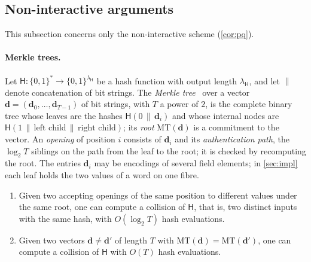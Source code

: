 \subsection{Non-interactive arguments}\label{sec:proofs:bcs}

This subsection concerns only the non-interactive scheme (\cref{cor:pq}).

\paragraph{Merkle trees.}
Let $\mathsf{H} : \{0,1\}^* \to \{0,1\}^{\lambda_{\mathsf{H}}}$ be a hash function with output length $\lambda_{\mathsf{H}}$, and let $\|$ denote concatenation of bit strings.
The \emph{Merkle tree}~\cite{Mer89} over a vector $\mathbf{d} = (\mathbf{d}_0,\dots,\mathbf{d}_{T-1})$ of bit strings, with $T$ a power of $2$, is the complete binary tree whose leaves are the hashes $\mathsf{H}(0 \,\|\, \mathbf{d}_i)$ and whose internal nodes are $\mathsf{H}(1 \,\|\, \text{left child} \,\|\, \text{right child})$; its \emph{root} $\mathrm{MT}(\mathbf{d})$ is a commitment to the vector.
An \emph{opening} of position $i$ consists of $\mathbf{d}_i$ and its \emph{authentication path}, the $\log_2 T$ siblings on the path from the leaf to the root; it is checked by recomputing the root.
The entries $\mathbf{d}_i$ may be encodings of several field elements; in \cref{sec:impl} each leaf holds the two values of a word on one fibre.

\begin{lemma}\label{lem:merkle}
\begin{enumerate}
  \item Given two accepting openings of the same position to different values under the same root, one can compute a collision of $\mathsf{H}$, that is, two distinct inputs with the same hash, with $O(\log_2 T)$ hash evaluations.
  \item Given two vectors $\mathbf{d} \ne \mathbf{d}'$ of length $T$ with $\mathrm{MT}(\mathbf{d}) = \mathrm{MT}(\mathbf{d}')$, one can compute a collision of $\mathsf{H}$ with $O(T)$ hash evaluations.
\end{enumerate}
\end{lemma}

